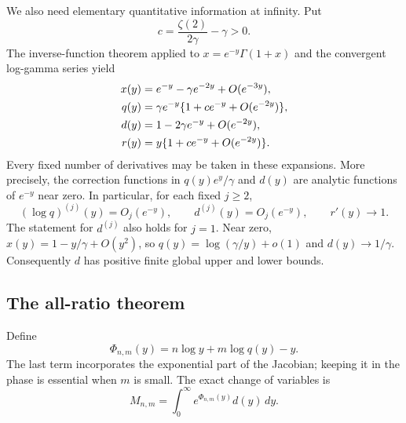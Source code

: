 We also need elementary quantitative information at infinity. Put
\[
 c=\frac{\zeta(2)}{2\gamma}-\gamma>0.
\]
The inverse-function theorem applied to
$x=e^{-y}\Gamma(1+x)$ and the convergent log-gamma series yield
\begin{align}
 x(y)&=e^{-y}-\gamma e^{-2y}+O(e^{-3y}),\notag\\
 q(y)&=\gamma e^{-y}\{1+c e^{-y}+O(e^{-2y})\},\label{eq:inverse-infinity}\\
 d(y)&=1-2\gamma e^{-y}+O(e^{-2y}),\notag\\
 r(y)&=y\{1+c e^{-y}+O(e^{-2y})\}.\notag
\end{align}
Every fixed number of derivatives may be taken in these expansions.
More precisely, the correction functions in $q(y)e^y/\gamma$ and
$d(y)$ are analytic functions of $e^{-y}$ near zero. In particular,
for each fixed $j\ge2$,
\begin{equation}\label{eq:derivative-bounds}
 (\log q)^{(j)}(y)=O_j(e^{-y}),\qquad
 d^{(j)}(y)=O_j(e^{-y}),\qquad r'(y)\longrightarrow1.
\end{equation}
The statement for $d^{(j)}$ also holds for $j=1$.
Near zero, $x(y)=1-y/\gamma+O(y^2)$, so
$q(y)=\log(\gamma/y)+o(1)$ and $d(y)\to1/\gamma$.
Consequently $d$ has positive finite global upper and lower bounds.

\subsection{The all-ratio theorem}

Define
\begin{equation}\label{eq:uniform-phase}
 \Phi_{n,m}(y)=n\log y+m\log q(y)-y.
\end{equation}
The last term incorporates the exponential part of the Jacobian; keeping
it in the phase is essential when $m$ is small. The exact change of
variables is
\begin{equation}\label{eq:exact-y-moment}
 M_{n,m}=\int_0^\infty e^{\Phi_{n,m}(y)}d(y)\,dy.
\end{equation}


